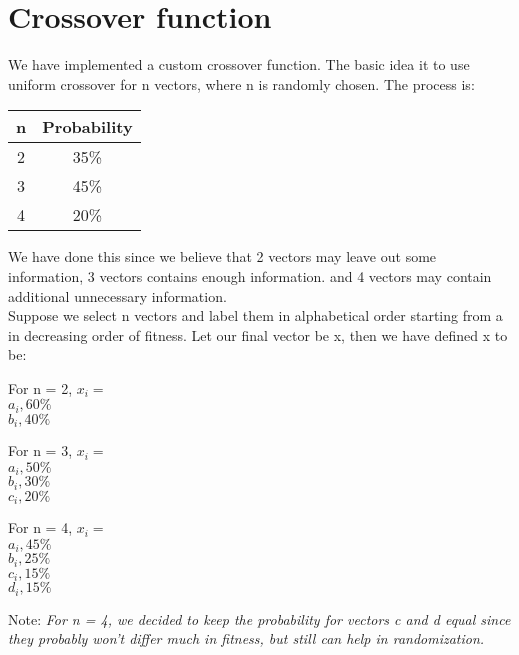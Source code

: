\documentclass[10pt]{report}
\theoremstyle{definition}
\theoremstyle{plain}
\begin{document}
\section*{Crossover function}
We have implemented a custom crossover function. The basic idea it to use uniform crossover for n vectors, where n is randomly chosen. The process is:\\
\begin{center}
 \begin{tabular}{||c | c||} 
 \hline
 n & Probability \\
 \hline\hline
 2 & 35\% \\
 \hline
 3 & 45\% \\
 \hline
 4 & 20\% \\
 \hline
 \hline
\end{tabular}
\end{center}
We have done this since we believe that 2 vectors may leave out some information, 3 vectors contains enough information. and 4 vectors may contain additional unnecessary information. \\

Suppose we select n vectors and label them in alphabetical order starting from a in decreasing order of fitness. Let our final vector be x, then we have defined x to be:
\begin{center}
    For n = 2, $x_i = $\\
    $a_i, 60\%$ \\
    $b_i, 40\%$ \vspace{0.3cm}
    
    For n = 3, $x_i = $\\
    $a_i, 50\%$ \\
    $b_i, 30\%$ \\
    $c_i, 20\%$ \vspace{0.3cm}
    
    For n = 4, $x_i = $\\
    $a_i, 45\%$ \\
    $b_i, 25\%$ \\
    $c_i, 15\%$ \\
    $d_i, 15\%$ \vspace{0.3cm}
\end{center}
Note: \textit{For n = 4, we decided to keep the probability for vectors c and d equal since they probably won't differ much in fitness, but still can help in randomization.}
\pagebreak
   
\end{document}
